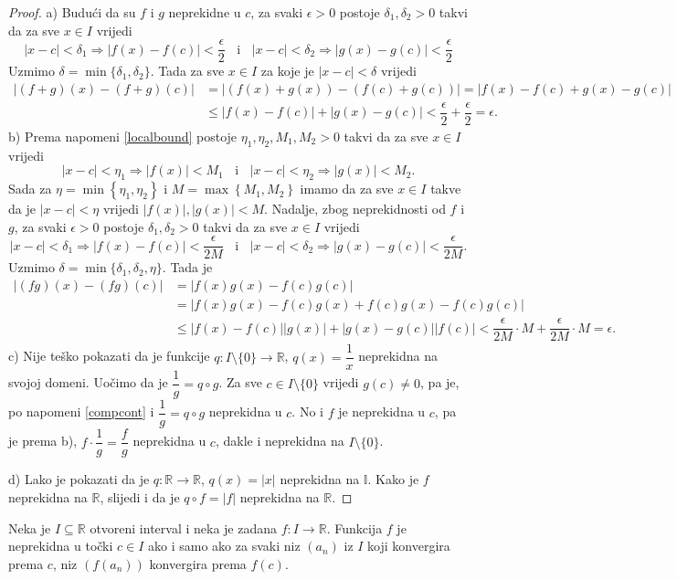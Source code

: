\begin{proof}
a) Budući da su \(f\) i \(g\) neprekidne u \(c\), za svaki \(\epsilon>0\) postoje \(\delta_1, \delta_2>0\) takvi da za sve \(x\in I\) vrijedi
\[|x-c|<\delta_1\Longrightarrow |f(x)-f(c)|<\dfrac{\epsilon}{2}\;\;\text{ i }\;\; |x-c|<\delta_2\Longrightarrow |g(x)-g(c)|<\dfrac{\epsilon}{2}\]
Uzmimo \(\delta=\min\{\delta_1, \delta_2\}\). Tada za sve \(x\in I\) za koje je \(|x-c|<\delta\) vrijedi
\begin{align*}
|(f+g)(x)-(f+g)(c)|&=\left\lvert \left(f(x)+g(x)\right)-\left(f(c)+g(c)\right)\right\rvert=\left\lvert f(x)-f(c)+g(x)-g(c)\right\rvert\\
&\leq |f(x)-f(c)|+|g(x)-g(c)|<\dfrac{\epsilon}{2}+\dfrac{\epsilon}{2}=\epsilon.
\end{align*}
b) Prema napomeni \ref{localbound} postoje \(\eta_1, \eta_2, M_1, M_2>0\) takvi da za sve \(x\in I\) vrijedi
\[|x-c|<\eta_1\Longrightarrow |f(x)|<M_1\;\;\text{ i }\;\; |x-c|<\eta_2\Longrightarrow |g(x)|<M_2.\]
Sada za \(\eta=\min\left\{\eta_1, \eta_2\right\}\) i \(M=\max\left\{M_1, M_2\right\}\) imamo da za sve \(x\in I\) takve da je \(|x-c|<\eta\) vrijedi \(|f(x)|, |g(x)|<M\). Nadalje, zbog neprekidnosti od \(f\) i \(g\), za svaki \(\epsilon>0\) postoje \(\delta_1, \delta_2>0\) takvi da za sve \(x\in I\) vrijedi
\[|x-c|<\delta_1\Longrightarrow |f(x)-f(c)|<\dfrac{\epsilon}{2M}\;\;\text{ i }\;\; |x-c|<\delta_2\Longrightarrow |g(x)-g(c)|<\dfrac{\epsilon}{2M}.\]
Uzmimo \(\delta=\min\{\delta_1, \delta_2, \eta\}\). Tada je
\begin{align*}
|(fg)(x)-(fg)(c)|&=\left\lvert f(x)g(x)-f(c)g(c)\right\rvert\\
&=\left\lvert f(x)g(x)-f(c)g(x)+f(c)g(x)-f(c)g(c)\right\rvert\\
&\leq |f(x)-f(c)||g(x)|+|g(x)-g(c)||f(c)|<\dfrac{\epsilon}{2M}\cdot M+\dfrac{\epsilon}{2M}\cdot M=\epsilon.
\end{align*}
c) Nije teško pokazati da je funkcije \(q : I\setminus\{0\}\to \mathbb{R}\), \(q(x)=\dfrac{1}{x}\) neprekidna na svojoj domeni. Uočimo da je \(\dfrac{1}{g}=q\circ g\). Za sve \(c\in I\setminus\{0\}\) vrijedi \(g(c)\neq 0\), pa je, po napomeni \ref{compcont} i \(\dfrac{1}{g}=q\circ g\) neprekidna u \(c\). No i \(f\) je neprekidna u \(c\), pa je prema b), \(f\cdot \dfrac{1}{g}=\dfrac{f}{g}\) neprekidna u \(c\), dakle i neprekidna na \(I\setminus\{0\}\).

d) Lako je pokazati da je \(q : \mathbb{R}\to \mathbb{R}\), \(q(x)=|x|\) neprekidna na \(\mathbb{I}\). Kako je \(f\) neprekidna na \(\mathbb{R}\), slijedi i da je \(q\circ f=|f|\) neprekidna na \(\mathbb{R}\).
\end{proof}
\begin{remark}
Neka je \(I\subseteq \mathbb{R}\) otvoreni interval i neka je zadana \(f : I\to \mathbb{R}\). Funkcija \(f\) je neprekidna u točki \(c\in I\) ako i samo ako za svaki niz \((a_n)\) iz \(I\) koji konvergira prema \(c\), niz \(\left(f(a_n)\right)\) konvergira prema \(f(c)\).
\end{remark}


